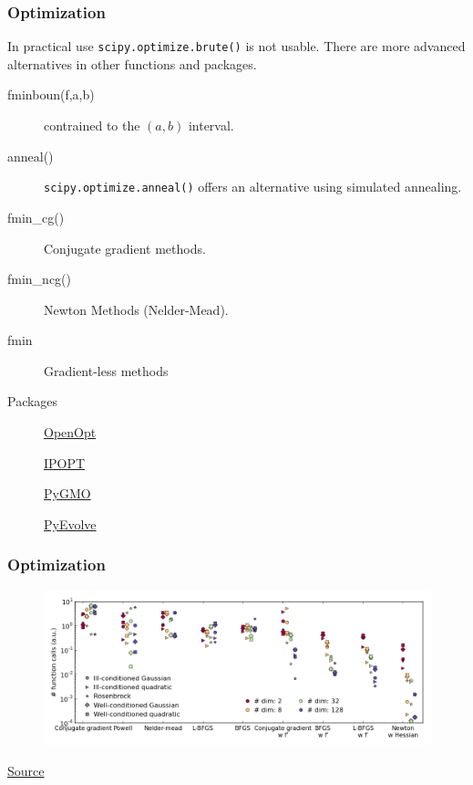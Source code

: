 \documentclass[10pt,colorlinks]{beamer}
\begin{document}
\begin{frame}[fragile]\frametitle{Optimization}
  
In practical use \verb|scipy.optimize.brute()| is not usable. There are more advanced alternatives in other functions and packages. 
\begin{description}
    \item[fminboun(f,a,b)] contrained to the $(a,b)$ interval.  
    \item[anneal()] \verb|scipy.optimize.anneal()| offers an alternative using simulated annealing.
     \item[fmin\_cg()] Conjugate gradient methods.   
   \item[fmin\_ncg()] Newton Methods (Nelder-Mead).
   \item[fmin] Gradient-less methods 
    \item[Packages] \href{http://openopt.org/Welcome}{OpenOpt} 
    \item[] \href{https://github.com/xuy/pyipopti}{IPOPT}
    \item[] \href{http://pagmo.sourceforge.net/pygmo/index.html}{PyGMO}
    \item[] \href{http://pyevolve.sourceforge.net/}{PyEvolve}

\end{description}
\end{frame}

\begin{frame}[fragile]\frametitle{Optimization}
  \begin{figure}[!htb]
      \centering
      \includegraphics[width=\textwidth]{figs/optims}
      \label{fig:}
  \end{figure}
\tiny{\href{http://scipy-lectures-scipy-lectures.github.com/advanced/mathematical_optimization/index.html#gradient-based-methods}{Source}}
\end{frame}
\end{document}
